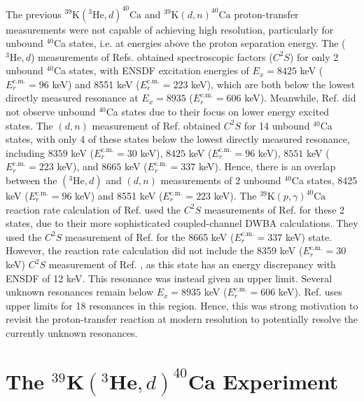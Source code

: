 The previous $^{39}\mathrm{K}(^{3}\mathrm{He},d)^{40}\mathrm{Ca}$ \cite{Erskine1966,Seth1967,Forster1970,Cage1971} and $^{39}\mathrm{K}(d,n)^{40}\mathrm{Ca}$ \cite{Fuchs1969} proton-transfer measurements were not capable of achieving high resolution, particularly for unbound $^{40}$Ca states, i.e. at energies above the proton separation energy. The ($^{3}\mathrm{He},d$) measurements of Refs. \cite{Erskine1966,Seth1967,Cage1971} obtained spectroscopic factors ($C^{2}S$) for only 2 unbound $^{40}$Ca states, with ENSDF \cite{Chen2017} excitation energies of $E_{x} = 8425$ keV ($E^{\mathrm{c.m.}}_{r} = 96$ keV) and 8551 keV ($E^{\mathrm{c.m.}}_{r} = 223$ keV), which are both below the lowest directly measured resonance at $E_{x} = 8935$ ($E^{\mathrm{c.m.}}_{r} = 606$ keV). Meanwhile, Ref. \cite{Forster1970} did not observe unbound $^{40}$Ca states due to their focus on lower energy excited states. The $(d,n)$ measurement of Ref. \cite{Fuchs1969} obtained $C^{2}S$ for 14 unbound $^{40}$Ca states, with only 4 of these states below the lowest directly measured resonance, including $8359$ keV ($E^{\mathrm{c.m.}}_{r} = 30$ keV), $8425$ keV ($E^{\mathrm{c.m.}}_{r} = 96$ keV), $8551$ keV ($E^{\mathrm{c.m.}}_{r} = 223$ keV), and $8665$ keV ($E^{\mathrm{c.m.}}_{r} = 337$ keV). Hence, there is an overlap between the $(^{3}\mathrm{He},d)$ and $(d,n)$ measurements of 2 unbound $^{40}$Ca states, 8425 keV ($E^{\mathrm{c.m.}}_{r} = 96$ keV) and 8551 keV ($E^{\mathrm{c.m.}}_{r} = 223$ keV). The $^{39}\mathrm{K}(p,\gamma)^{40}\mathrm{Ca}$ reaction rate calculation of Ref. \cite{Longland2018} used the $C^{2}S$ measurements of Ref. \cite{Cage1971} for these 2 states, due to their more sophisticated coupled-channel DWBA calculations. They used the $C^{2}S$ measurement of Ref. \cite{Fuchs1969} for the 8665 keV ($E^{\mathrm{c.m.}}_{r} = 337$ keV) state. However, the reaction rate calculation did not include the 8359 keV ($E^{\mathrm{c.m.}}_{r} = 30$ keV) $C^{2}S$ measurement of Ref. \cite{Fuchs1969}, as this state has an energy discrepancy with ENSDF \cite{Chen2017} of 12 keV. This resonance was instead given an upper limit. Several unknown resonances remain below $E_{x} = 8935$ keV ($E^{\mathrm{c.m.}}_{r} = 606$ keV). Ref. \cite{Longland2018} uses upper limits for 18 resonances in this region. Hence, this was strong motivation to revisit the proton-transfer reaction at modern resolution to potentially resolve the currently unknown resonances.

\section{The $^{39}\mathrm{\textbf{K}}(^{3}\mathrm{\textbf{He}},d)^{40}\mathrm{\textbf{Ca}}$ Experiment}

